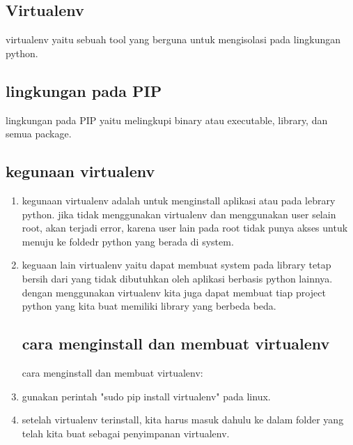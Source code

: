				
	\subsection{Virtualenv}
	virtualenv yaitu sebuah tool yang berguna untuk mengisolasi pada lingkungan python.
	
	\subsection{lingkungan pada PIP}
	lingkungan pada PIP yaitu melingkupi binary atau executable, library, dan semua package.
	
	\subsection{kegunaan virtualenv}
\begin{enumerate}
			\item kegunaan virtualenv adalah untuk menginstall aplikasi atau pada lebrary python. jika tidak menggunakan virtualenv dan menggunakan user selain root,
				akan terjadi error, karena user lain pada root tidak punya akses untuk menuju ke foldedr python yang berada di system.
			\item keguaan lain virtualenv yaitu dapat membuat system pada library tetap bersih dari yang tidak dibutuhkan oleh aplikasi berbasis python lainnya.
				dengan menggunakan virtualenv kita juga dapat membuat tiap project python yang kita buat memiliki library yang berbeda beda. 
				
	\subsection {cara menginstall dan membuat virtualenv}
	cara menginstall dan membuat virtualenv:
			\item gunakan perintah "sudo pip install virtualenv" pada linux.
			\item setelah virtualenv terinstall, kita harus masuk dahulu ke dalam folder yang telah kita buat sebagai penyimpanan virtualenv.

\end{enumerate}
			
